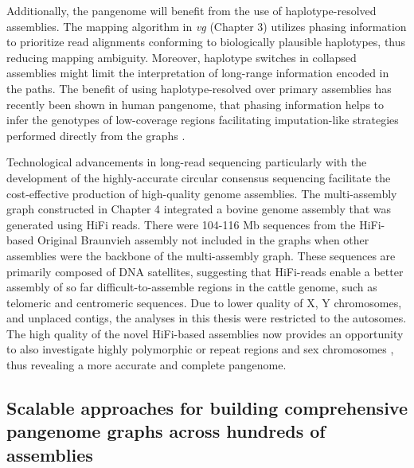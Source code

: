 \documentclass[../main.tex]{subfiles}
\begin{document}
Additionally, the pangenome will benefit from the use of haplotype-resolved assemblies. The mapping algorithm in \emph{vg} (Chapter 3) utilizes phasing information to prioritize read alignments conforming to biologically plausible  haplotypes, thus reducing mapping ambiguity. Moreover, haplotype switches in collapsed assemblies might limit the interpretation of long-range information encoded in the paths. The benefit of using haplotype-resolved over primary assemblies has recently been shown in human pangenome, that phasing information helps to infer the genotypes of low-coverage regions facilitating imputation-like strategies performed directly from the graphs \citep{ebler2020pangenome,ebert2021haplotype}. 

Technological advancements in long-read sequencing particularly with the development of the highly-accurate circular consensus sequencing \citep{Wenger2019} facilitate the cost-effective production of high-quality genome assemblies. The multi-assembly graph constructed in Chapter 4 integrated a bovine genome assembly that was generated using HiFi reads. There were 104-116 Mb sequences from the HiFi-based Original Braunvieh assembly not included in the graphs when other assemblies were the backbone of the multi-assembly graph. These sequences are primarily composed of DNA satellites, suggesting that HiFi-reads enable a better assembly of so far difficult-to-assemble regions in the cattle genome, such as telomeric and centromeric sequences. Due to lower quality of X, Y chromosomes, and unplaced contigs, the analyses in this thesis were restricted to the autosomes. The high quality of the novel HiFi-based assemblies now provides an opportunity to also investigate highly polymorphic or repeat regions and sex chromosomes \citep{logsdon2021structure,miga2020telomere}, thus revealing a more accurate and complete pangenome.  

\subsection*{Scalable approaches for building comprehensive pangenome graphs across hundreds of assemblies}
\end{document}
